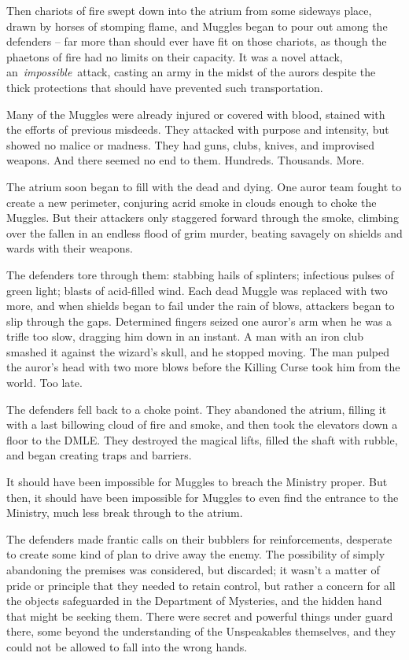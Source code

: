 Then chariots of fire swept down into the atrium from some sideways
place, drawn by horses of stomping flame, and Muggles began to pour out
among the defenders -- far more than should ever have fit on those
chariots, as though the phaetons of fire had no limits on their
capacity. It was a novel attack, an~\emph{impossible}~attack, casting an
army in the midst of the aurors despite the thick protections that
should have prevented such transportation.

Many of the Muggles were already injured or covered with blood, stained
with the efforts of previous misdeeds. They attacked with purpose and
intensity, but showed no malice or madness. They had guns, clubs,
knives, and improvised weapons. And there seemed no end to them.
Hundreds. Thousands. More.

The atrium soon began to fill with the dead and dying. One auror team
fought to create a new perimeter, conjuring acrid smoke in clouds enough
to choke the Muggles. But their attackers only staggered forward through
the smoke, climbing over the fallen in an endless flood of grim murder,
beating savagely on shields and wards with their weapons.

The defenders tore through them: stabbing hails of splinters; infectious
pulses of green light; blasts of acid-filled wind. Each dead Muggle was
replaced with two more, and when shields began to fail under the rain of
blows, attackers began to slip through the gaps. Determined fingers
seized one auror's arm when he was a trifle too slow, dragging him down
in an instant. A man with an iron club smashed it against the wizard's
skull, and he stopped moving. The man pulped the auror's head with two
more blows before the Killing Curse took him from the world. Too late.

The defenders fell back to a choke point. They abandoned the atrium,
filling it with a last billowing cloud of fire and smoke, and then took
the elevators down a floor to the DMLE. They destroyed the magical
lifts, filled the shaft with rubble, and began creating traps and
barriers.

It should have been impossible for Muggles to breach the Ministry
proper. But then, it should have been impossible for Muggles to even
find the entrance to the Ministry, much less break through to the
atrium.

The defenders made frantic calls on their bubblers for reinforcements,
desperate to create some kind of plan to drive away the enemy. The
possibility of simply abandoning the premises was considered, but
discarded; it wasn't a matter of pride or principle that they needed to
retain control, but rather a concern for all the objects safeguarded in
the Department of Mysteries, and the hidden hand that might be seeking
them. There were secret and powerful things under guard there, some
beyond the understanding of the Unspeakables themselves, and they could
not be allowed to fall into the wrong hands.

